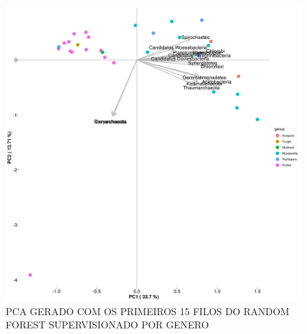 \documentclass[12pt, a4paper]{report}
\begin{document}
\begin{figure}[H]
\centering
\includegraphics[scale=0.4]{figures/pca_corais_mg_rast_rf_supervisionado_genus_15_filos_23_10_2018.jpg}
\caption{PCA GERADO COM OS PRIMEIROS 15 FILOS DO RANDOM FOREST SUPERVISIONADO POR GENERO}
\end{figure}


\newpage
\end{document}
